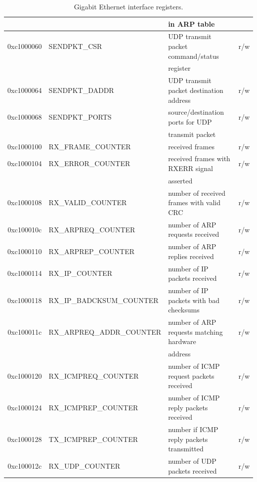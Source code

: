 \documentclass[11pt]{article}
\begin{document}
\begin{table}
\begin{center}
\begin{tabular}{|c|l|l|c|}
           &                      & in ARP table &   \\ \hline
0xc1000060 & SENDPKT\_CSR & UDP transmit packet command/status & r/w \\
           &              & register &  \\ \hline
0xc1000064 & SENDPKT\_DADDR & UDP transmit packet destination address & r/w \\ \hline
0xc1000068 & SENDPKT\_PORTS & source/destination ports for UDP & r/w \\
           &                & transmit packet &     \\ \hline
0xc1000100 & RX\_FRAME\_COUNTER & received frames & r/w \\ \hline
0xc1000104 & RX\_ERROR\_COUNTER & received frames with RXERR signal & r/w \\
           &                    & asserted &  \\ \hline
0xc1000108 & RX\_VALID\_COUNTER & number of received frames with valid CRC & r/w \\ \hline
0xc100010c & RX\_ARPREQ\_COUNTER & number of ARP requests received & r/w \\ \hline
0xc1000110 & RX\_ARPREP\_COUNTER & number of ARP replies received & r/w \\ \hline
0xc1000114 & RX\_IP\_COUNTER & number of IP packets received & r/w \\ \hline
0xc1000118 & RX\_IP\_BADCKSUM\_COUNTER & number of IP packets with bad checksums & r/w \\ \hline
0xc100011c & RX\_ARPREQ\_ADDR\_COUNTER & number of ARP requests matching hardware & r/w \\
           &                           & address & \\ \hline
0xc1000120 & RX\_ICMPREQ\_COUNTER & number of ICMP request packets received & r/w \\ \hline
0xc1000124 & RX\_ICMPREP\_COUNTER & number of ICMP reply packets received & r/w \\ \hline
0xc1000128 & TX\_ICMPREP\_COUNTER & number if ICMP reply packets transmitted & r/w \\ \hline
0xc100012c & RX\_UDP\_COUNTER & number of UDP packets received & r/w \\ \hline
\end{tabular}
\end{center}
\caption{\label{tab-gbe}Gigabit Ethernet interface registers.}
\end{table}
\end{document}
